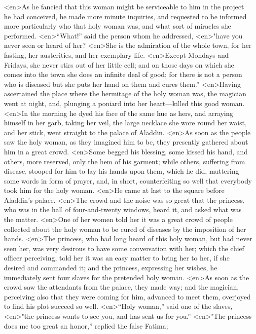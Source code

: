 <en>As he fancied that this woman might be serviceable to him in the project he had conceived, he made more minute inquiries, and requested to be informed more particularly who that holy woman was, and what sort of miracles she performed.
<en>“What!” said the person whom he addressed,
<en>"have you never seen or heard of her?
<en>She is the admiration of the whole town, for her fasting, her austerities, and her exemplary life.
<en>Except Mondays and Fridays, she never stirs out of her little cell; and on those days on which she comes into the town she does an infinite deal of good; for there is not a person who is diseased but she puts her hand on them and cures them.”
<en>Having ascertained the place where the hermitage of the holy woman was, the magician went at night, and, plunging a poniard into her heart—killed this good woman.
<en>In the morning he dyed his face of the same hue as hers, and arraying himself in her garb, taking her veil, the large necklace she wore round her waist, and her stick, went straight to the palace of Aladdin.
<en>As soon as the people saw the holy woman, as they imagined him to be, they presently gathered about him in a great crowd.
<en>Some begged his blessing, some kissed his hand, and others, more reserved, only the hem of his garment; while others, suffering from disease, stooped for him to lay his hands upon them, which he did, muttering some words in form of prayer, and, in short, counterfeiting so well that everybody took him for the holy woman.
<en>He came at last to the square before Aladdin’s palace.
<en>The crowd and the noise was so great that the princess, who was in the hall of four-and-twenty windows, heard it, and asked what was the matter.
<en>One of her women told her it was a great crowd of people collected about the holy woman to be cured of diseases by the imposition of her hands.
<en>The princess, who had long heard of this holy woman, but had never seen her, was very desirous to have some conversation with her; which the chief officer perceiving, told her it was an easy matter to bring her to her, if she desired and commanded it; and the princess, expressing her wishes, he immediately sent four slaves for the pretended holy woman.
<en>As soon as the crowd saw the attendants from the palace, they made way; and the magician, perceiving also that they were coming for him, advanced to meet them, overjoyed to find his plot succeed so well.
<en>“Holy woman,” said one of the slaves,
<en>"the princess wants to see you, and has sent us for you.”
<en>"The princess does me too great an honor,” replied the false Fatima;
